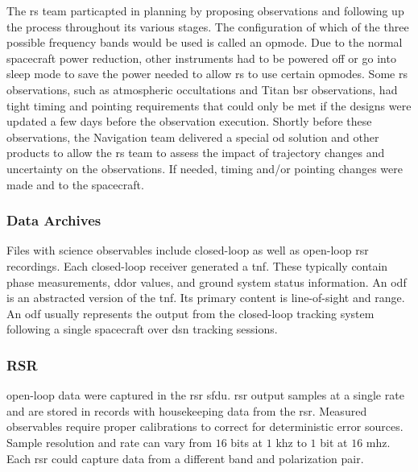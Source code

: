 \documentclass{article}
\theoremstyle{mystyle}
\begin{document}
\par
The \gls{rs} team particapted in planning by proposing observations and following up the process throughout its various stages. The configuration of which of the three possible frequency bands would be used is called an \gls{opmode}. Due
to the normal spacecraft power reduction, other instruments had to be powered off or go into sleep mode to save the power needed to allow \gls{rs} to use certain \glspl{opmode}. Some \gls{rs} observations, such as atmospheric \glspl{occultation}
and Titan \gls{bsr} observations, had tight timing and pointing requirements that could only be met if the designs were updated a few days before the observation execution. Shortly before these observations, the Navigation team delivered a special \gls{od} solution and other products to allow the \gls{rs} team to assess the impact of trajectory
changes and uncertainty on the observations. If needed, timing and/or pointing changes
were made and  to the spacecraft.

\subsubsection{Data Archives}

Files with science observables include \gls{closed-loop}  as well as \gls{open-loop} \gls{rsr} recordings. Each \gls{closed-loop} receiver generated a \gls{tnf}. These typically contain  \gls{phase} measurements, \gls{ddor} values, and ground system status information. An \gls{odf} is an abstracted version of the \gls{tnf}. Its primary content is line-of-sight  and range. An \gls{odf} usually represents the output from the \gls{closed-loop} tracking system following a single spacecraft over \gls{dsn} tracking sessions. 

\subsubsection{\footnotesize RSR \label{subsubsec:usr_RSR}}
\Gls{open-loop} data were captured in the \gls{rsr} \gls{sfdu}. \gls{rsr} output samples at a single rate and are stored in records with housekeeping data from the \gls{rsr}. Measured observables require proper calibrations to correct for deterministic error sources. Sample
resolution and rate can vary from $16$ \glspl{bit} at $1$ \gls{khz} to $1$ \gls{bit} at $16$ \gls{mhz}. Each \gls{rsr} could
capture data from a different band and \gls{polarization} pair.
\end{document}
